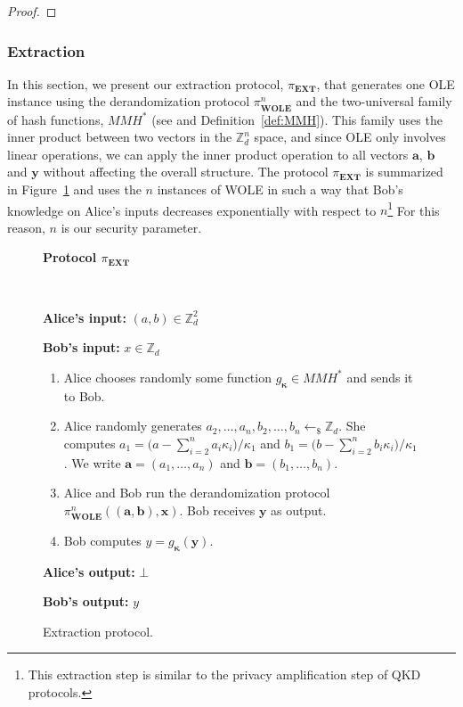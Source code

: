 \begin{proof}
\end{proof}




\subsubsection{Extraction}

 In this section, we present our extraction protocol, $\mathcal{\pi}_{\textbf{EXT}}$,  that generates one OLE instance using the derandomization protocol $\mathcal{\pi}^n_{\textbf{WOLE}}$ and the two-universal family of hash functions, $MMH^*$ (see \cite{HK97} and Definition~\ref{def:MMH}). This family uses the inner product between two vectors in the $\mathbb{Z}^n_d$ space, and since OLE only involves linear operations, we can apply the inner product operation to all vectors $\bm{a}$, $\bm{b}$ and $\bm{y}$ without affecting the overall structure. The protocol $\mathcal{\pi}_{\textbf{EXT}}$ is summarized in Figure~\ref{fig:privacy_amplification} and uses the $n$ instances of WOLE in such a way that Bob's knowledge on Alice's inputs decreases exponentially with respect to $n$\footnote{ This extraction step is similar to the privacy amplification step of QKD protocols.}  For this reason, $n$ is our security parameter.

\begin{figure}[h!]
    \centering
        \begin{tcolorbox}
            
            \centerline{\textbf{Protocol $\mathcal{\pi}_{\textbf{EXT}}$}}
            
            \
            
    \textbf{Alice's input:} $(a, b) \in\mathbb{Z}_d^2$ 
    
    \textbf{Bob's input:} $x \in\mathbb{Z}_d$
    
\begin{enumerate}
    \item Alice chooses randomly some function $g_{\bm{\kappa}} \in MMH^*$ and sends it to Bob.
    \item  Alice randomly generates $a_2, \ldots, a_n, b_2, \ldots, b_n\leftarrow_{\$}\mathbb{Z}_d$. She computes $a_1 = \big(a - \sum_{i=2}^{n} a_i \kappa_i\big)/\kappa_1$ and $b_1 = \big(b - \sum_{i=2}^{n} b_i \kappa_i\big)/\kappa_1$. We write $\bm{a} = (a_1, \ldots, a_n)$ and $\bm{b} = (b_1, \ldots, b_n)$.
    \item Alice and Bob run the derandomization protocol $\mathcal{\pi}^n_{\textbf{WOLE}}((\bm{a}, \bm{b}), \bm{x})$. Bob receives  $\bm{y}$ as output.
    
    \item Bob computes $y = g_{\bm{\kappa}}(\bm{y})$.
\end{enumerate}

\textbf{Alice's output:} $\bot$

\textbf{Bob's output:} $y$
        
        \end{tcolorbox}
\caption{Extraction protocol.}
\label{fig:privacy_amplification}
\end{figure}

